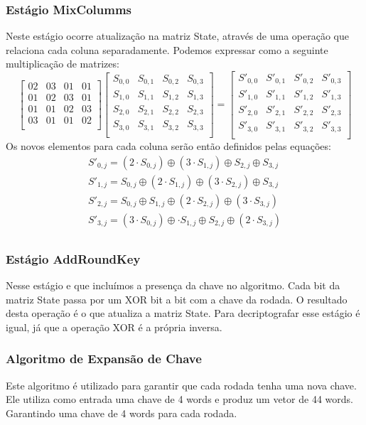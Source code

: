 \subsubsection{Estágio MixColumms}
Neste estágio ocorre atualização na matriz State, através de uma operação que relaciona cada coluna separadamente. Podemos expressar como a seguinte multiplicação de matrizes:
$$
 \left[
\begin{array}{cccc}
02  & 03 & 01 & 01  \\
01  & 02 & 03 & 01 \\
01  & 01 & 02 & 03 \\
03  & 01 & 01 & 02  \\
\end{array}
\right]
 \left[
\begin{array}{cccc}
S_{0,0}  & S_{0,1} & S_{0,2} & S_{0,3}  \\
S_{1,0}  & S_{1,1} & S_{1,2} & S_{1,3}  \\
S_{2,0}  & S_{2,1} & S_{2,2} & S_{2,3}  \\
S_{3,0}  & S_{3,1} & S_{3,2} & S_{3,3}  \\
\end{array}
\right]=
 \left[
\begin{array}{cccc}
S'_{0,0}  & S'_{0,1} & S'_{0,2} & S'_{0,3}  \\
S'_{1,0}  & S'_{1,1} & S'_{1,2} & S'_{1,3}  \\
S'_{2,0}  & S'_{2,1} & S'_{2,2} & S'_{2,3}  \\
S'_{3,0}  & S'_{3,1} & S'_{3,2} & S'_{3,3}  \\
\end{array}
\right]
$$
Os novos elementos para cada coluna serão então definidos pelas equações:
$$
\begin{array}{c}

S'_{0,j}=(2\cdot S_{0,j})\oplus(3\cdot S_{1,j})\oplus S_{2,j}\oplus S_{3,j} \\
S'_{1,j}=S_{0,j}\oplus(2\cdot S_{1,j})\oplus(3\cdot S_{2,j})\oplus S_{3,j} \\
S'_{2,j}=S_{0,j}\oplus S_{1,j}\oplus(2\cdot S_{2,j})\oplus (3\cdot S_{3,j}) \\
S'_{3,j}=(3\cdot S_{0,j})\oplus\cdot S_{1,j}\oplus S_{2,j}\oplus(2\cdot S_{3,j}) \\
\end{array}
$$

\subsubsection{Estágio AddRoundKey}
Nesse estágio e que incluímos a presença da chave no algoritmo. Cada bit da matriz State passa por um XOR bit a bit com a chave da rodada. O resultado desta operação é o que atualiza a matriz State. 
Para decriptografar esse estágio é igual, já que a operação XOR é a própria inversa.

\subsubsection{Algoritmo de Expansão de Chave}

Este algoritmo é utilizado para garantir que cada rodada tenha uma nova chave. Ele utiliza como entrada uma chave de 4 words e produz um vetor de 44 words. Garantindo uma chave de 4 words para cada rodada.
